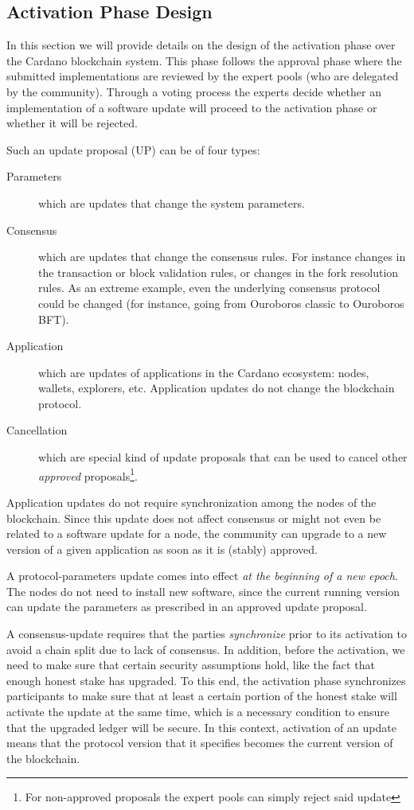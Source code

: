 \subsection{Activation Phase Design}\label{activation_phase_design}
In this section we will provide details on the design of the activation phase 
over the Cardano blockchain system.
%
This phase follows the approval phase where the submitted implementations are
reviewed by the expert pools (who are delegated by the community).
%
Through a voting process the experts decide whether an implementation of a
software update will proceed to the activation phase or whether it will be
rejected.

Such an update proposal (UP) can be of four types:
\begin{description}
	\item[Parameters] which are updates that change the system parameters.
	\item[Consensus] which are updates that change the consensus rules. For 
	instance
	changes in the transaction or block validation rules, or changes in the fork
	resolution rules. As an extreme example, even the underlying consensus
	protocol could be changed (for instance, going from Ouroboros classic to
	Ouroboros BFT).
	\item[Application] which are updates of applications in the Cardano 
	ecosystem:
	nodes, wallets, explorers, etc. Application updates do not change the
	blockchain protocol.
	\item[Cancellation] which are special kind of update proposals that can be 
	used
	to cancel other \emph{approved} proposals\footnote{For non-approved 
	proposals
		the expert pools can simply reject said update}.
\end{description}

Application updates do not require synchronization among the nodes of the
blockchain. Since this update does not affect consensus or might not even be
related to a software update for a node, the community can upgrade to a new
version of a given application as soon as it is (stably) approved.

A protocol-parameters update comes into effect \emph{at the beginning of a new
	epoch}. The nodes do not need to install new software, since the current
running version can update the parameters as prescribed in an approved update
proposal.

A consensus-update requires that the parties \emph{synchronize} prior to its
activation to avoid a chain split due to lack of consensus. In addition, before
the activation, we need to make sure that certain security assumptions hold,
like the fact that enough honest stake has upgraded.
%
To this end, the activation phase synchronizes participants to make sure that at
least a certain portion of the honest stake will activate the update at the same
time, which is a necessary condition to ensure that the upgraded ledger will be
secure.
%
In this context, activation of an update means that the protocol version that it
specifies becomes the current version of the blockchain.

